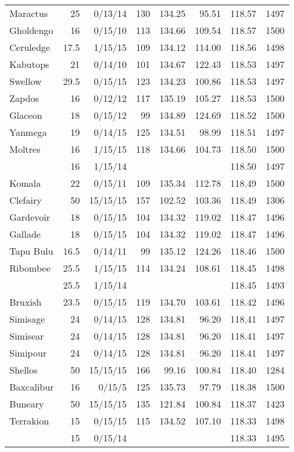 \begin{longtable}{lrrrrrrr}
Maractus & 25 & 0/13/14 & 130 & 134.25 & 95.51 & 118.57 & 1497\\
Gholdengo & 16 & 0/15/10 & 113 & 134.66 & 109.54 & 118.57 & 1500\\
Ceruledge & 17.5 & 1/15/15 & 109 & 134.12 & 114.00 & 118.56 & 1498\\
Kabutops & 21 & 0/14/10 & 101 & 134.67 & 122.43 & 118.53 & 1497\\
Swellow & 29.5 & 0/15/15 & 123 & 134.23 & 100.86 & 118.53 & 1497\\
Zapdos & 16 & 0/12/12 & 117 & 135.19 & 105.27 & 118.53 & 1500\\
Glaceon & 18 & 0/15/12 & 99 & 134.89 & 124.69 & 118.52 & 1500\\
Yanmega & 19 & 0/14/15 & 125 & 134.51 & 98.99 & 118.51 & 1497\\
Moltres & 16 & 1/15/15 & 118 & 134.66 & 104.73 & 118.50 & 1500\\
 & 16 & 1/15/14 & & & & 118.50 & 1497\\
Komala & 22 & 0/15/11 & 109 & 135.34 & 112.78 & 118.49 & 1500\\
Clefairy & 50 & 15/15/15 & 157 & 102.52 & 103.36 & 118.49 & 1306\\
Gardevoir & 18 & 0/15/15 & 104 & 134.32 & 119.02 & 118.47 & 1496\\
Gallade & 18 & 0/15/15 & 104 & 134.32 & 119.02 & 118.47 & 1496\\
Tapu Bulu & 16.5 & 0/14/11 & 99 & 135.12 & 124.26 & 118.46 & 1500\\
Ribombee & 25.5 & 1/15/15 & 114 & 134.24 & 108.61 & 118.45 & 1498\\
 & 25.5 & 1/15/14 & & & & 118.45 & 1493\\
Bruxish & 23.5 & 0/15/15 & 119 & 134.70 & 103.61 & 118.42 & 1496\\
Simisage & 24 & 0/14/15 & 128 & 134.81 & 96.20 & 118.41 & 1497\\
Simisear & 24 & 0/14/15 & 128 & 134.81 & 96.20 & 118.41 & 1497\\
Simipour & 24 & 0/14/15 & 128 & 134.81 & 96.20 & 118.41 & 1497\\
Shellos & 50 & 15/15/15 & 166 & 99.16 & 100.84 & 118.40 & 1284\\
Baxcalibur & 16 & 0/15/5 & 125 & 135.73 & 97.79 & 118.38 & 1500\\
Buneary & 50 & 15/15/15 & 135 & 121.84 & 100.84 & 118.37 & 1423\\
Terrakion & 15 & 0/15/15 & 115 & 134.52 & 107.10 & 118.33 & 1498\\
 & 15 & 0/15/14 & & & & 118.33 & 1495\\

\end{longtable}
